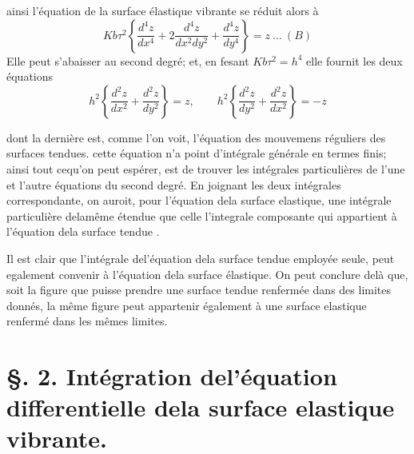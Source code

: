 \documentclass[11pt,a4paper]{article}
\begin{document}
ainsi l'équation de la surface élastique vibrante se réduit alors
à
\[ Kb\tau^2\left\{\frac{d^4z}{dx^4}+2\frac{d^4z}{dx^2dy^2}+\frac{d^4z}{dy^4}\right\} = z\ \ldots\ (B) \]
Elle peut s'abaisser au second degré; et, en fesant $Kb\tau^2 = h^4$
elle fournit les deux équations
\[ h^2\left\{\frac{d^2z}{dx^2}+\frac{d^2z}{dy^2}\right\} = z, \qquad h^2\left\{\frac{d^2z}{dy^2}+\frac{d^2z}{dx^2}\right\} = -z \]

dont la dernière est, comme l'on voit, l'équation des mouvemens
réguliers des surfaces tendues.  cette équation n'a point
d'intégrale générale en termes finis; ainsi tout cequ'on peut
espérer, est de trouver les intégrales particulières de l'une et
l'autre équations du second degré.  En joignant les deux
intégrales correspondante, on auroit, pour l'équation dela
surface elastique, une intégrale particulière delamême étendue
que celle   l'integrale composante qui appartient à l'équation
dela surface tendue .

Il est clair que l'intégrale del'équation dela surface tendue
employée seule, peut egalement convenir à l'équation dela surface
élastique. On peut conclure delà que,   soit la figure
que puisse prendre une surface tendue renfermée dans
des limites donnés, la même figure peut appartenir également
à une surface elastique renfermé dans les mêmes limites.

\section{§. 2. Intégration del'équation differentielle dela surface elastique vibrante.}
\end{document}

